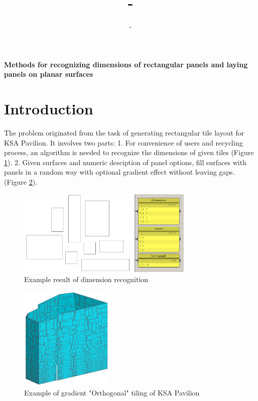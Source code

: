 \documentclass{article}
\title{-}
\author{-}
\begin{document}
\begin{center}

	\Large\bfseries
	Methods for recognizing dimensions of rectangular panels and laying panels on planar surfaces

\end{center}

\section{Introduction}

The problem originated from the task of generating rectangular tile layout for KSA Pavilion. It involves two parts: 1. For convenience of users and recycling process, an algorithm is needed to recognize the dimensions of given tiles (Figure \ref{recognition}). 2. Given surfaces and numeric desciption of panel options, fill surfaces with panels in a random way with optional gradient effect without leaving gaps. (Figure \ref{overview}).

\begin{figure}[hbt!]
	\centering
	\includegraphics[width=0.75\textwidth]{Figures/Recognition.png}
	\caption{
        Example result of dimension recognition
    }
	\label{recognition}
\end{figure}

\begin{figure}[hbt!]
	\centering
	\includegraphics[width=0.4\textwidth]{Figures/Overview.png}
	\caption{Example of gradient "Orthogonal" tiling of KSA Pavilion}
	\label{overview}
\end{figure}
\end{document}
